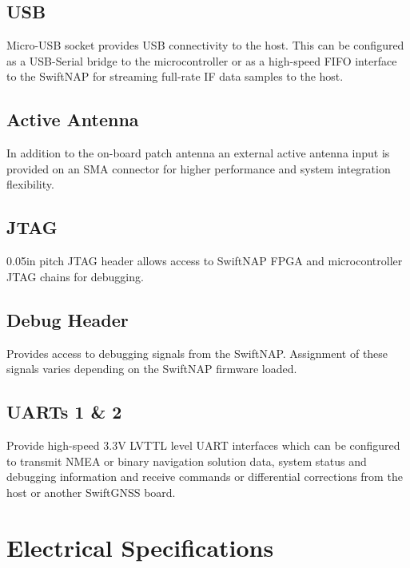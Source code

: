 \documentclass{article}
\begin{document}
\begin{multicols}{2}
\raggedcolumns

\subsection*{USB}

Micro-USB socket provides USB connectivity to the host. This can be configured
as a USB-Serial bridge to the microcontroller or as a high-speed FIFO
interface to the SwiftNAP for streaming full-rate IF data samples to the host.

\subsection*{Active Antenna}

In addition to the on-board patch antenna an external active antenna input is
provided on an SMA connector for higher performance and system integration
flexibility.

\subsection*{JTAG}

0.05in pitch JTAG header allows access to SwiftNAP FPGA and microcontroller
JTAG chains for debugging.

\subsection*{Debug Header}

Provides access to debugging signals from the SwiftNAP. Assignment of these
signals varies depending on the SwiftNAP firmware loaded.

\subsection*{UARTs 1 \& 2}

Provide high-speed 3.3V LVTTL level UART interfaces which can be configured to
transmit NMEA or binary navigation solution data, system status and debugging
information and receive commands or differential corrections from the host or another
SwiftGNSS board.

\end{multicols}

\pagebreak

\section*{Electrical Specifications}
\end{document}
